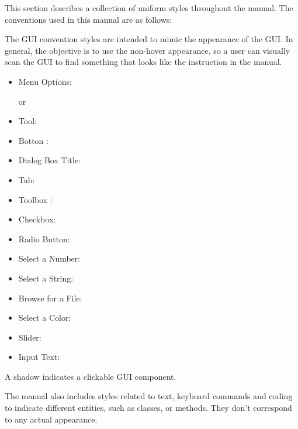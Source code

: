 \label{label_conventions}

This section describes a collection of uniform styles throughout the manual. The conventions used in this manual are as follows:


The GUI convention styles are intended to mimic the appearance of the GUI. In general, the objective is to use the non-hover appearance, so a user can visually scan the GUI to find something that looks like the instruction in the manual.

\begin{itemize}[label=--,itemsep=5pt]
\item Menu Options:  \arrow
{}

or

 \arrow
{} \arrow {}
\item Tool: 
\item Botton : 
\item Dialog Box Title: 
\item Tab: 

\item Toolbox :  
\item Checkbox: 
\item Radio Button:   
\item Select a Number: 
\item Select a String: 
\item Browse for a File: \browsebutton 
\item Select a Color: 
\item Slider: 
\item Input Text: 
\end{itemize}
A shadow indicates a clickable GUI component.


The manual also includes styles related to text, keyboard commands and coding to indicate different entities, such as classes, or methods. They don't correspond to any actual appearance.

